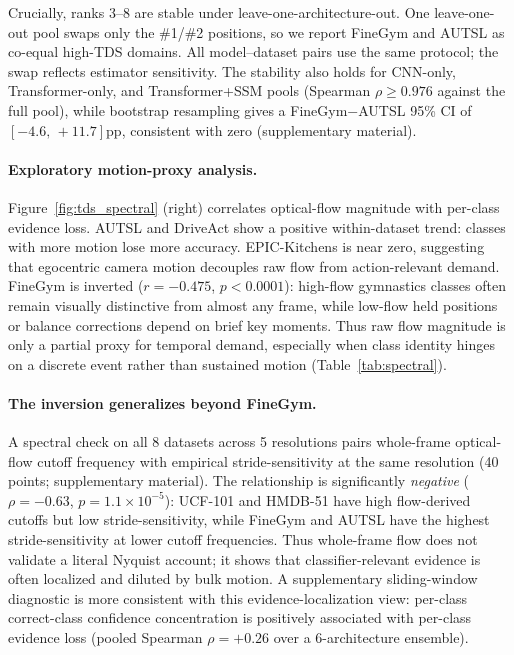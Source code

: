 \documentclass[runningheads]{llncs}
\newcommand{\TDS}{\textsc{TDS}}
\newcommand{\rev}[1]{\textcolor{revblue}{#1}}
\newcommand{\revdel}[1]{}
\begin{document}
\rev{Crucially, ranks 3--8 are stable under leave-one-architecture-out. One leave-one-out pool swaps only the \#1/\#2 positions, so we report FineGym and AUTSL as co-equal high-\TDS{} domains. All model--dataset pairs use the same protocol; the swap reflects estimator sensitivity.} The stability also holds for CNN-only, Transformer-only, and Transformer+SSM pools (Spearman $\rho\geq0.976$ against the full pool), while bootstrap resampling gives a FineGym$-$AUTSL 95\% CI of $[-4.6,\,+11.7]$pp, consistent with zero (supplementary material).

\paragraph{\rev{Exploratory motion-proxy analysis.}\revdel{Spectral validation.}}
Figure~\ref{fig:tds_spectral} (right) correlates optical-flow magnitude with per-class \rev{evidence loss}. \rev{AUTSL and DriveAct show a positive within-dataset trend: classes with more motion lose more accuracy.} EPIC-Kitchens is near zero, suggesting that egocentric camera motion decouples raw flow from action-relevant demand. FineGym is inverted ($r=-0.475$, $p<0.0001$): high-flow gymnastics classes often remain visually distinctive from almost any frame, while low-flow held positions or balance corrections depend on brief key moments. Thus raw flow magnitude is only a partial proxy for temporal demand, especially when class identity hinges on a discrete event rather than sustained motion (Table~\ref{tab:spectral}).

\paragraph{The inversion generalizes beyond FineGym.} A spectral check on all 8 datasets across 5 resolutions pairs whole-frame optical-flow cutoff frequency with empirical stride-sensitivity at the same resolution (40 points; supplementary material). The relationship is significantly \emph{negative} ($\rho=-0.63$, $p=1.1{\times}10^{-5}$): UCF-101 and HMDB-51 have high flow-derived cutoffs but low stride-sensitivity, while FineGym and AUTSL have the highest stride-sensitivity at lower cutoff frequencies. Thus whole-frame flow does not validate a literal Nyquist account; it shows that classifier-relevant evidence is often localized and diluted by bulk motion. A supplementary sliding-window diagnostic is more consistent with this evidence-localization view: per-class correct-class confidence concentration is positively associated with per-class \rev{evidence loss} (pooled Spearman $\rho=+0.26$ over a 6-architecture ensemble).
\end{document}
